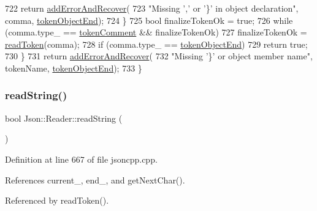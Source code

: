 \begin{DoxyCode}
722       \textcolor{keywordflow}{return} \hyperlink{class_json_1_1_reader_a478db8ac6d00db1409608a37b66bc38d}{addErrorAndRecover}(
723           \textcolor{stringliteral}{"Missing ',' or '\}' in object declaration"}, comma, \hyperlink{class_json_1_1_reader_aa35e6ab574dc399a0a645ad98ed66bc9a12d03a3a710b2d3f1384889df3da887d}{tokenObjectEnd});
724     \}
725     \textcolor{keywordtype}{bool} finalizeTokenOk = \textcolor{keyword}{true};
726     \textcolor{keywordflow}{while} (comma.type\_ == \hyperlink{class_json_1_1_reader_aa35e6ab574dc399a0a645ad98ed66bc9ae4fcf05c3b1ce462bacd34af0ccac32b}{tokenComment} && finalizeTokenOk)
727       finalizeTokenOk = \hyperlink{class_json_1_1_reader_a7cb0631963cc0fd4ff6ed0f570976864}{readToken}(comma);
728     \textcolor{keywordflow}{if} (comma.type\_ == \hyperlink{class_json_1_1_reader_aa35e6ab574dc399a0a645ad98ed66bc9a12d03a3a710b2d3f1384889df3da887d}{tokenObjectEnd})
729       \textcolor{keywordflow}{return} \textcolor{keyword}{true};
730   \}
731   \textcolor{keywordflow}{return} \hyperlink{class_json_1_1_reader_a478db8ac6d00db1409608a37b66bc38d}{addErrorAndRecover}(
732       \textcolor{stringliteral}{"Missing '\}' or object member name"}, tokenName, \hyperlink{class_json_1_1_reader_aa35e6ab574dc399a0a645ad98ed66bc9a12d03a3a710b2d3f1384889df3da887d}{tokenObjectEnd});
733 \}
\end{DoxyCode}
\mbox{\label{class_json_1_1_reader_a6328a0b1994e05118886f9fc9c608643}} 
\subsubsection{\texorpdfstring{read\+String()}{readString()}}
{\footnotesize\ttfamily bool Json\+::\+Reader\+::read\+String (\begin{DoxyParamCaption}{ }\end{DoxyParamCaption})\hspace{0.3cm}{\ttfamily [private]}}



Definition at line 667 of file jsoncpp.\+cpp.



References current\+\_\+, end\+\_\+, and get\+Next\+Char().



Referenced by read\+Token().


